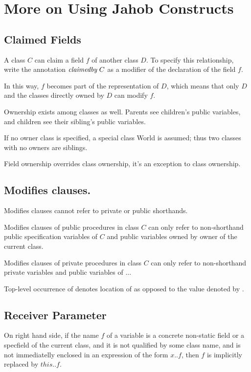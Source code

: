\section{More on Using Jahob Constructs}

\subsection{Claimed Fields}

A class $C$ can claim a field $f$ of another class $D$.  To specify
this relationship, write the annotation $\textit{claimedby}\ C$ as a
modifier of the declaration of the field $f$.  

In this way, $f$ becomes part of the representation of $D$, which
means that only $D$ and the classes directly owned by $D$ can modify
$f$.

Ownership exists among classes as well.  Parents see children's public
variables, and children see their sibling's public variables.

If no owner class is specified, a special class World is assumed; thus
two classes with no owners are siblings.

Field ownership overrides class ownership, it's an exception to class
ownership.

\subsection{Modifies clauses.}
\label{sec:modifies}

Modifies clauses cannot refer to private or public shorthands.

Modifies clauses of public procedures in class $C$ can only refer to
non-shorthand public specification variables of $C$ and public
variables owned by owner of the current class.

Modifies clauses of private procedures in class $C$ can only refer
to non-shorthand private variables and public variables of ...

Top-level occurrence of  denotes  location of 
as opposed to the value denoted by .

\subsection{Receiver Parameter}

On right hand side, if the name $f$ of a variable is a concrete
non-static field or a specfield of the current class, and it is not
qualified by some class name, and is not immediatelly enclosed in an
expression of the form $x..f$, then $f$ is implicitly replaced by
$this..f$.

